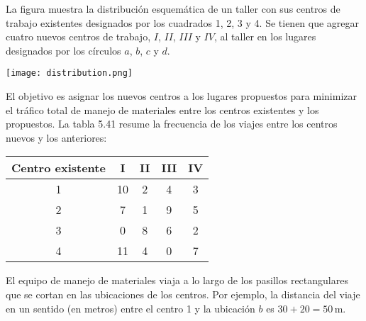 \documentclass{article}
\begin{document}
\begin{problem}
    La figura muestra la distribución esquemática de un taller con sus centros de trabajo existentes designados por los cuadrados 1, 2, 3 y 4. Se tienen que agregar cuatro nuevos centros de trabajo, \( I \), \( II \), \( III \) y \( IV \), al taller en los lugares designados por los círculos \( a \), \( b \), \( c \) y \( d \).

\begin{center}
    \texttt{[image: distribution.png]} %
\end{center}

El objetivo es asignar los nuevos centros a los lugares propuestos para minimizar el tráfico total de manejo de materiales entre los centros existentes y los propuestos. La tabla 5.41 resume la frecuencia de los viajes entre los centros nuevos y los anteriores:

\begin{center}
\begin{tabular}{|c|c|c|c|c|}
\hline
\textbf{Centro existente} & \textbf{I} & \textbf{II} & \textbf{III} & \textbf{IV} \\
\hline
1 & 10 & 2 & 4 & 3 \\
\hline
2 & 7 & 1 & 9 & 5 \\
\hline
3 & 0 & 8 & 6 & 2 \\
\hline
4 & 11 & 4 & 0 & 7 \\
\hline
\end{tabular}
\end{center}

El equipo de manejo de materiales viaja a lo largo de los pasillos rectangulares que se cortan en las ubicaciones de los centros. Por ejemplo, la distancia del viaje en un sentido (en metros) entre el centro 1 y la ubicación \( b \) es \( 30 + 20 = 50 \, \mathrm{m} \).
\end{problem}
\end{document}
